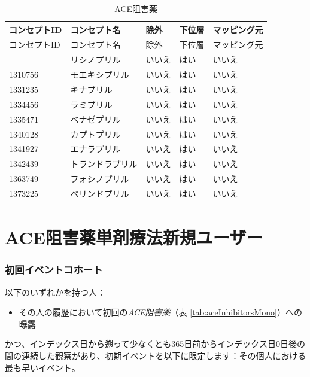 \documentclass[
  11pt]{book}
\providecommand{\tightlist}{%
  \setlength{\itemsep}{0pt}\setlength{\parskip}{0pt}}
\theoremstyle{definition}
\theoremstyle{definition}
\theoremstyle{definition}
\theoremstyle{definition}
\theoremstyle{remark}
\begin{document}
\begin{longtable}[]{@{}lllll@{}}
\caption{\label{tab:aceInhibitors} ACE阻害薬}\tabularnewline
\toprule\noalign{}
コンセプトID & コンセプト名 & 除外 & 下位層 & マッピング元 \\
\midrule\noalign{}
\endfirsthead
\toprule\noalign{}
コンセプトID & コンセプト名 & 除外 & 下位層 & マッピング元 \\
\midrule\noalign{}
\endhead
\bottomrule\noalign{}
\endlastfoot
1308216 & リシノプリル & いいえ & はい & いいえ \\
1310756 & モエキシプリル & いいえ & はい & いいえ \\
1331235 & キナプリル & いいえ & はい & いいえ \\
1334456 & ラミプリル & いいえ & はい & いいえ \\
1335471 & ベナゼプリル & いいえ & はい & いいえ \\
1340128 & カプトプリル & いいえ & はい & いいえ \\
1341927 & エナラプリル & いいえ & はい & いいえ \\
1342439 & トランドラプリル & いいえ & はい & いいえ \\
1363749 & フォシノプリル & いいえ & はい & いいえ \\
1373225 & ペリンドプリル & いいえ & はい & いいえ \\
\end{longtable}

\section{ACE阻害薬単剤療法新規ユーザー}\label{AceInhibitorsMono}

\subsubsection*{初回イベントコホート}\label{ux521dux56deux30a4ux30d9ux30f3ux30c8ux30b3ux30dbux30fcux30c8-1}

以下のいずれかを持つ人：

\begin{itemize}
\tightlist
\item
  その人の履歴において初回の\emph{ACE阻害薬}（表 \ref{tab:aceInhibitorsMono}）への曝露
\end{itemize}

かつ、インデックス日から遡って少なくとも365日前からインデックス日0日後の間の連続した観察があり、初期イベントを以下に限定します：その個人における最も早いイベント。
\end{document}
